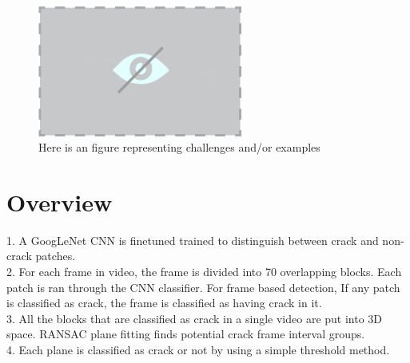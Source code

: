 \begin{figure}
\begin{centering}
\includegraphics[width=0.6\textwidth]{Images/NoVisualHolder.png}
\caption{Here is an figure representing challenges and/or examples}
\label{fig:FigChallenges}
\end{centering}
\end{figure}

\section{Overview}
    1. A GoogLeNet CNN is finetuned trained to distinguish between crack and non-crack patches. \\
    2. For each frame in video, the frame is  divided into 70 overlapping blocks. Each patch is ran through the CNN classifier. For frame based detection, If any patch is classified as crack, the frame is classified as having crack in it. \\
    3. All the blocks that are classified as crack in a single video are put into 3D space. RANSAC plane fitting finds potential crack frame interval groups. \\
    4. Each plane is classified as crack or not by using a simple threshold method. \\

